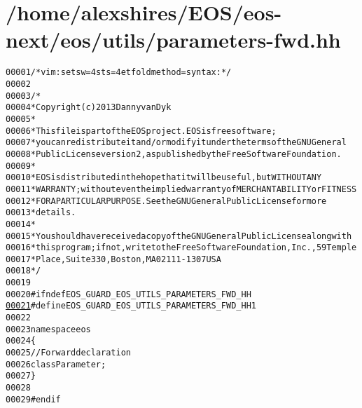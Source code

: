 \hypertarget{parameters-fwd_8hh_source}{
\section{/home/alexshires/EOS/eos-\/next/eos/utils/parameters-\/fwd.hh}
}


\begin{footnotesize}\begin{alltt}
00001 \textcolor{comment}{/* vim: set sw=4 sts=4 et foldmethod=syntax : */}
00002 
00003 \textcolor{comment}{/*}
00004 \textcolor{comment}{ * Copyright (c) 2013 Danny van Dyk}
00005 \textcolor{comment}{ *}
00006 \textcolor{comment}{ * This file is part of the EOS project. EOS is free software;}
00007 \textcolor{comment}{ * you can redistribute it and/or modify it under the terms of the GNU General}
00008 \textcolor{comment}{ * Public License version 2, as published by the Free Software Foundation.}
00009 \textcolor{comment}{ *}
00010 \textcolor{comment}{ * EOS is distributed in the hope that it will be useful, but WITHOUT ANY}
00011 \textcolor{comment}{ * WARRANTY; without even the implied warranty of MERCHANTABILITY or FITNESS}
00012 \textcolor{comment}{ * FOR A PARTICULAR PURPOSE.  See the GNU General Public License for more}
00013 \textcolor{comment}{ * details.}
00014 \textcolor{comment}{ *}
00015 \textcolor{comment}{ * You should have received a copy of the GNU General Public License along with}
00016 \textcolor{comment}{ * this program; if not, write to the Free Software Foundation, Inc., 59 Temple}
00017 \textcolor{comment}{ * Place, Suite 330, Boston, MA  02111-1307  USA}
00018 \textcolor{comment}{ */}
00019 
00020 \textcolor{preprocessor}{#ifndef EOS\_GUARD\_EOS\_UTILS\_PARAMETERS\_FWD\_HH}
\hypertarget{parameters-fwd_8hh_source_l00021}{}\hyperlink{parameters-fwd_8hh_a2a2180e38e23a73b3b7a21e3238fa9ef}{00021} \textcolor{preprocessor}{}\textcolor{preprocessor}{#define EOS\_GUARD\_EOS\_UTILS\_PARAMETERS\_FWD\_HH 1}
00022 \textcolor{preprocessor}{}
00023 \textcolor{keyword}{namespace }eos
00024 \{
00025     \textcolor{comment}{// Forward declaration}
00026     \textcolor{keyword}{class }Parameter;
00027 \}
00028 
00029 \textcolor{preprocessor}{#endif}
\end{alltt}\end{footnotesize}

